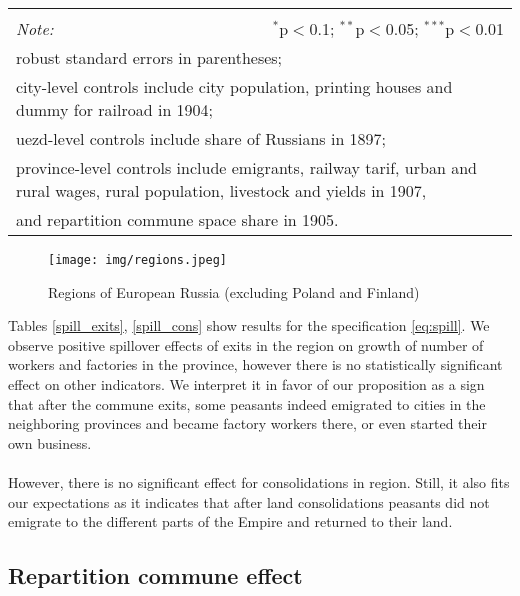 \documentclass[a4paper, 12pt]{article}
\begin{document}
\begin{table}[!htbp]
{\begin{tabular}{@{\extracolsep{5pt}}lcccccc}
\hline 
\hline \\[-1.8ex] 
\textit{Note:}  & \multicolumn{6}{r}{$^{*}$p$<$0.1; $^{**}$p$<$0.05; $^{***}$p$<$0.01} \\ 
\multicolumn{7}{l}{robust standard errors in parentheses;} \\
\multicolumn{7}{l}{city-level controls include city population, printing houses and dummy for railroad in 1904;} \\
\multicolumn{7}{l}{uezd-level controls include share of Russians in 1897;}\\
\multicolumn{7}{l}{province-level controls include emigrants, railway tarif, urban and rural wages, rural population, livestock and yields in 1907,}\\
\multicolumn{7}{l}{ and repartition commune space share in 1905.}
\end{tabular}
}
\end{table}

\begin{figure}[!htbp]
    \centering
    \texttt{[image: img/regions.jpeg]}
    \caption{Regions of European Russia (excluding Poland and Finland)}
    \label{fig:regions}
\end{figure}


\noindent Tables \ref{spill_exits}, \ref{spill_cons} show results for the specification \ref{eq:spill}. We observe positive spillover effects of exits in the region on growth of number of workers and factories in the province, however there is no statistically significant effect on other indicators. We interpret it in favor of our proposition as a sign that after the commune exits, some peasants indeed emigrated to cities in the neighboring provinces and became factory workers there, or even started their own business. 
\\\\
\noindent However, there is no significant effect for consolidations in region. Still, it also fits our expectations as it indicates that after land consolidations peasants did not emigrate to the different parts of the Empire and returned to their land.


\subsection{Repartition commune effect}
\end{document}
